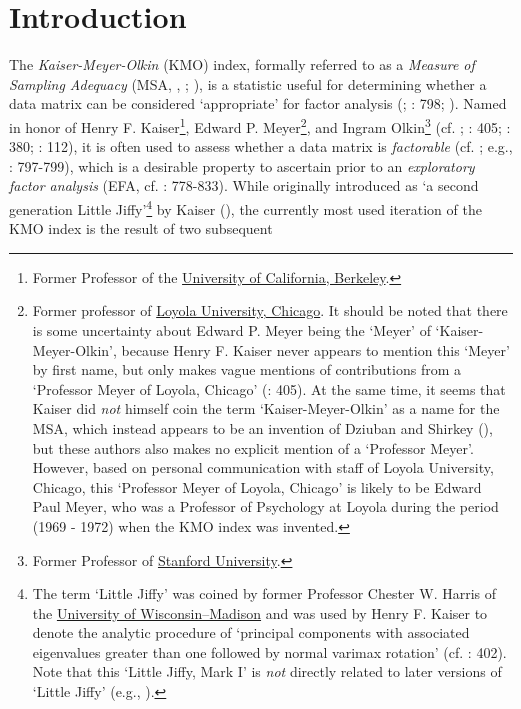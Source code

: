 \documentclass[
  10pt,
  a4paper,
  twoside]{article}
\begin{document}
\newpage

\section{Introduction}\label{sec:sec_introduction}

The \emph{Kaiser-Meyer-Olkin} (KMO) index, formally referred to as a \emph{Measure of Sampling Adequacy} (MSA, , ; ), is a statistic useful for determining whether a data matrix can be considered `appropriate' for factor analysis (; : 798; ). Named in honor of Henry F. Kaiser\footnote{Former Professor of the \href{https://www.berkeley.edu/}{University of California, Berkeley}.}, Edward P. Meyer\footnote{Former professor of \href{https://www.luc.edu/}{Loyola University, Chicago}. It should be noted that there is some uncertainty about Edward P. Meyer being the `Meyer' of `Kaiser-Meyer-Olkin', because Henry F. Kaiser never appears to mention this `Meyer' by first name, but only makes vague mentions of contributions from a `Professor Meyer of Loyola, Chicago' (: 405). At the same time, it seems that Kaiser did \emph{not} himself coin the term `Kaiser-Meyer-Olkin' as a name for the MSA, which instead appears to be an invention of Dziuban and Shirkey (), but these authors also makes no explicit mention of a `Professor Meyer'. However, based on personal communication with staff of Loyola University, Chicago, this `Professor Meyer of Loyola, Chicago' is likely to be Edward Paul Meyer, who was a Professor of Psychology at Loyola during the period (1969 - 1972) when the KMO index was invented.}, and Ingram Olkin\footnote{Former Professor of \href{https://www.stanford.edu/}{Stanford University}.} (cf. ; : 405; : 380; : 112), it is often used to assess whether a data matrix is \emph{factorable} (cf. ; e.g., : 797-799), which is a desirable property to ascertain prior to an \emph{exploratory factor analysis} (EFA, cf. : 778-833). While originally introduced as `a second generation Little Jiffy'\footnote{The term `Little Jiffy' was coined by former Professor Chester W. Harris of the \href{https://www.wisc.edu/}{University of Wisconsin--Madison} and was used by Henry F. Kaiser to denote the analytic procedure of `principal components with associated eigenvalues greater than one followed by normal varimax rotation' (cf. : 402). Note that this `Little Jiffy, Mark I' is \emph{not} directly related to later versions of `Little Jiffy' (e.g., ).} by Kaiser (), the currently most used iteration of the KMO index is the result of two subsequent 
\end{document}
